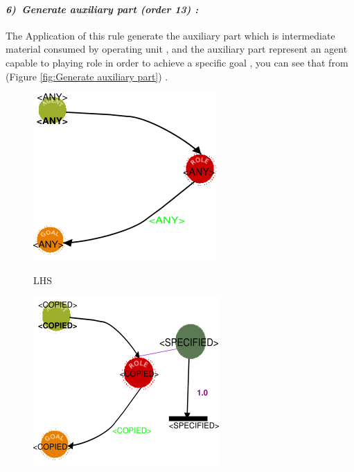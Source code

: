 \vspace{1cm}

\paragraph{\emph{6)~Generate auxiliary part  (order 13) :} }
 
 
The Application of this rule generate the auxiliary part which is intermediate material consumed by operating unit , and the auxiliary part represent an agent capable to playing role in order to achieve a specific goal , you can see that from (Figure \ref{fig:Generate auxiliary part}) .
\vspace{1cm}
\begin{figure}[th]
\centering
\begin{minipage}{.6\textwidth}
 
  \includegraphics[width=.7\linewidth]{Chapiter3/img/L6}
  \linebreak

\hspace{2.5cm}  LHS
  
\end{minipage}%
\begin{minipage}{.6\textwidth}
 
  \includegraphics[width=.7\linewidth]{Chapiter3/img/R6}
\linebreak  


\end{minipage}
\end{figure}
